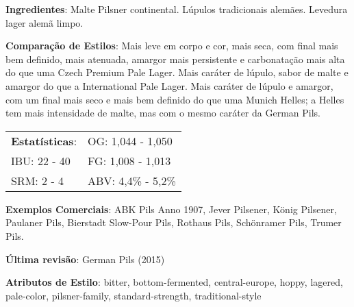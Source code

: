 \textbf{Ingredientes}: Malte Pilsner continental. Lúpulos tradicionais alemães. Levedura lager alemã limpo.

\textbf{Comparação de Estilos}: Mais leve em corpo e cor, mais seca, com final mais bem definido, mais atenuada, amargor mais persistente e carbonatação mais alta do que uma Czech Premium Pale Lager. Mais caráter de lúpulo, sabor de malte e amargor do que a International Pale Lager. Mais caráter de lúpulo e amargor, com um final mais seco e mais bem definido do que uma Munich Helles; a Helles tem mais intensidade de malte, mas com o mesmo caráter da German Pils.

\begin{tabular}{@{}p{35mm}p{35mm}@{}}
  \textbf{Estatísticas}: & OG: 1,044 - 1,050 \\
  IBU: 22 - 40  & FG: 1,008 - 1,013  \\
  SRM: 2 - 4  & ABV: 4,4\% - 5,2\%
\end{tabular}

\textbf{Exemplos Comerciais}: ABK Pils Anno 1907, Jever Pilsener, König Pilsener, Paulaner Pils, Bierstadt Slow-Pour Pils, Rothaus Pils, Schönramer Pils, Trumer Pils.

\textbf{Última revisão}: German Pils (2015)

\textbf{Atributos de Estilo}: bitter, bottom-fermented, central-europe, hoppy, lagered, pale-color, pilsner-family, standard-strength, traditional-style
